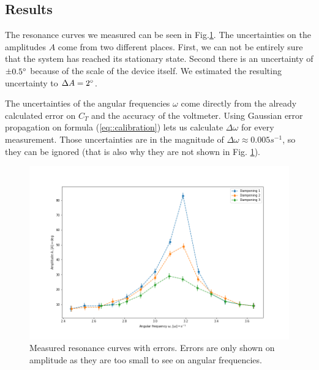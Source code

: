 \subsection{Results}
The resonance curves we measured can be seen in Fig.\ref{fig::resonance}.
The uncertainties on the amplitudes $A$ come from two different places.
First, we can not be entirely sure that the system has reached its stationary state.
Second there is an uncertainty of $\pm 0.5 \degree$ because of the scale of the device itself.
We estimated the resulting uncertainty to $\Delta A = 2 \degree$.

The uncertainties of the angular frequencies $\omega$ come directly from the already calculated error on $C_T$ and the accuracy of the voltmeter.
Using Gaussian error propagation on formula (\ref{eq::calibration}) lets us calculate $\Delta \omega$ for every measurement. 
Those uncertainties are in the magnitude of $\Delta \omega \approx 0.005 s^{-1}$, so they can be ignored (that is also why they are not shown in Fig. \ref{fig::resonance}).

\begin{figure} [ht]
	\centering
	\includegraphics[width=350pt]{python/resonance.PNG}
	\caption{Measured resonance curves with errors. Errors are only shown on amplitude as they are too small to see on angular frequencies.}
	\label{fig::resonance}
\end{figure}
